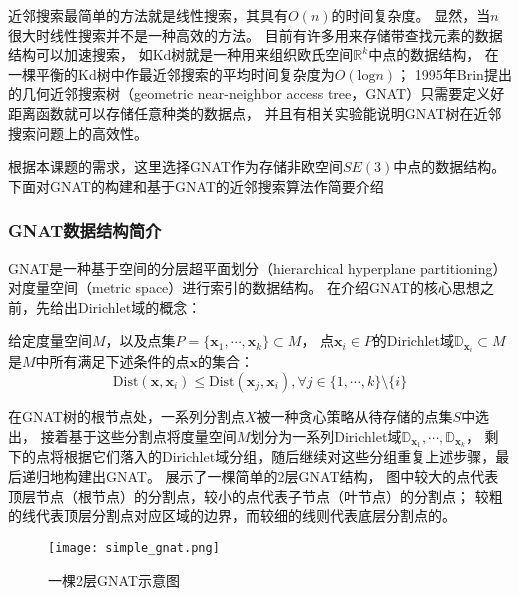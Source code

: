 近邻搜索最简单的方法就是线性搜索，其具有$O(n)$的时间复杂度。
显然，当$n$很大时线性搜索并不是一种高效的方法。
目前有许多用来存储带查找元素的数据结构可以加速搜索，
如Kd树\cite{bentley1975multidimensional}就是一种用来组织欧氏空间$\mathbb{R}^k$中点的数据结构，
在一棵平衡的Kd树中作最近邻搜索的平均时间复杂度为$O(\text{log}n)$；
1995年Brin提出的几何近邻搜索树（geometric near-neighbor access tree，GNAT）\cite{1995Near}只需要定义好距离函数就可以存储任意种类的数据点，
并且有相关实验能说明GNAT树在近邻搜索问题上的高效性。

根据本课题的需求，这里选择GNAT作为存储非欧空间$SE(3)$中点的数据结构。下面对GNAT的构建和基于GNAT的近邻搜索算法作简要介绍

\subsubsection{GNAT数据结构简介}\label{subsubsec:introduction_of_gnat}
GNAT是一种基于空间的分层超平面划分（hierarchical hyperplane partitioning）对度量空间（metric space）进行索引的数据结构。
在介绍GNAT的核心思想之前，先给出Dirichlet域的概念\cite{Engel1986}：
\begin{definition}[（Dirichlet域）]
  \label{def:dirichlet_domain}
  给定度量空间$M$，以及点集$P=\{\bm{x}_1,\cdots,\bm{x}_k\} \subset M$，
  点$\bm{x}_i \in P$的Dirichlet域$\mathbb{D}_{\bm{x}_i} \subset M$是$M$中所有满足下述条件的点$\bm{x}$的集合：
  \begin{equation}
    \text{Dist}(\bm{x}, \bm{x}_i) \leq \text{Dist}(\bm{x}_j,\bm{x}_i),\forall j \in \{1,\cdots,k\} \setminus \{i\}
    \label{condition_of_points_in_Dirichlet_domain}
  \end{equation}
\end{definition}

在GNAT树的根节点处，一系列分割点$X$被一种贪心策略从待存储的点集$S$中选出，
接着基于这些分割点将度量空间$M$划分为一系列Dirichlet域$\mathbb{D}_{\bm{x}_1},\cdots,\mathbb{D}_{\bm{x}_k}$，
剩下的点将根据它们落入的Dirichlet域分组，随后继续对这些分组重复上述步骤，最后递归地构建出GNAT。
展示了一棵简单的2层GNAT结构，
图中较大的点代表顶层节点（根节点）的分割点，较小的点代表子节点（叶节点）的分割点；
较粗的线代表顶层分割点对应区域的边界，而较细的线则代表底层分割点的。
\begin{figure}[ht]
  \centering
  \texttt{[image: simple\_gnat.png]}
  \caption{一棵2层GNAT示意图}
  \label{fig:simple_gnat}
\end{figure}

